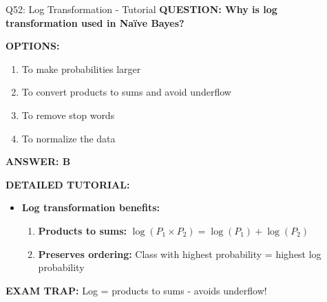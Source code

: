 \documentclass[8pt]{beamer}
\begin{document}
	\begin{frame}{Q52: Log Transformation - Tutorial}
		\fontsize{6.5}{7.5}\selectfont
		\textbf{QUESTION: Why is log transformation used in Naïve Bayes?}
		
		\vspace{0.1cm}
		\textbf{OPTIONS:}
		\begin{enumerate}
			\item To make probabilities larger
			\item To convert products to sums and avoid underflow
			\item To remove stop words
			\item To normalize the data
		\end{enumerate}
		
		\vspace{0.1cm}
		\textcolor{myblue}{\textbf{ANSWER: B}}
		
		\vspace{0.1cm}
		\textbf{DETAILED TUTORIAL:}
		\begin{itemize}
			\item \textbf{Log transformation benefits:}
			\begin{enumerate}
				\item \textbf{Products to sums:} $\log(P_1 \times P_2) = \log(P_1) + \log(P_2)$
				\item \textbf{Preserves ordering:} Class with highest probability = highest log probability
			\end{enumerate}
		\end{itemize}
		
		\textcolor{myred}{\textbf{EXAM TRAP:}} Log = \textcolor{myblue}{products to sums} - avoids underflow!
	\end{frame}
	
\end{document}
